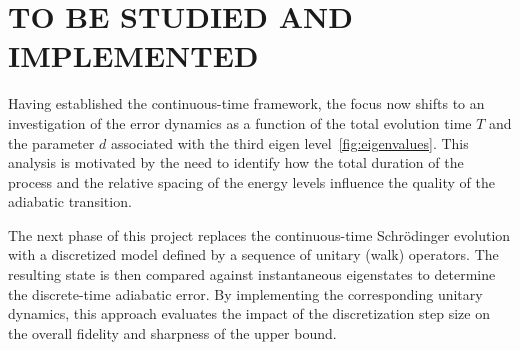 \documentclass[11pt,a4paper]{article}
\begin{document}
\vspace{-0.2cm}
\section{TO BE STUDIED AND IMPLEMENTED}

Having established the continuous-time framework, the focus now shifts to an investigation of the error dynamics as a function of the total evolution time $T$ and the parameter $d$ associated with the third eigen level~\ref{fig:eigenvalues}. This analysis is motivated by the need to identify how the total duration of the process and the relative spacing of the energy levels influence the quality of the adiabatic transition. 
\vspace{0.1cm}

The next phase of this project replaces the continuous-time Schrödinger evolution with a discretized model defined by a sequence of unitary (walk) operators. The resulting state is then compared against instantaneous eigenstates to determine the discrete-time adiabatic error. By implementing the corresponding unitary dynamics, this approach evaluates the impact of the discretization step size on the overall fidelity and sharpness of the upper bound. 
\end{document}
